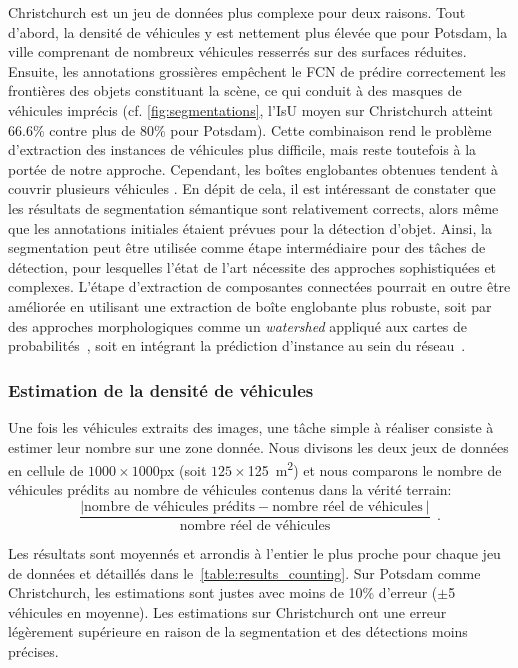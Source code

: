 Christchurch est un jeu de données plus complexe pour deux raisons. Tout d'abord, la densité de véhicules y est nettement plus élevée que pour Potsdam, la ville comprenant de nombreux véhicules resserrés sur des surfaces réduites. Ensuite, les annotations grossières empêchent le \gls{FCN} de prédire correctement les frontières des objets constituant la scène, ce qui conduit à des masques de véhicules imprécis (cf. \cref{fig:segmentations}, l'\gls{IsU} moyen sur Christchurch atteint 66.6\% contre plus de 80\% pour Potsdam). Cette combinaison rend le problème d'extraction des instances de véhicules plus difficile, mais reste toutefois à la portée de notre approche. Cependant, les boîtes englobantes obtenues tendent à couvrir plusieurs véhicules .
En dépit de cela, il est intéressant de constater que les résultats de segmentation sémantique sont relativement corrects, alors même que les annotations initiales étaient prévues pour la détection d'objet. Ainsi, la segmentation peut être utilisée comme étape intermédiaire pour des tâches de détection, pour lesquelles l'état de l'art nécessite des approches sophistiquées et complexes. L'étape d'extraction de composantes connectées pourrait en outre être améliorée en utilisant une extraction de boîte englobante plus robuste, soit par des approches morphologiques comme un \emph{watershed} appliqué aux cartes de probabilités~\cite{beucher_morphological_1993,bai_deep_2017}, soit en intégrant la prédiction d'instance au sein du réseau~\cite{dai_instance-aware_2015,he_mask_2017}.

\subsubsection{Estimation de la densité de véhicules}

Une fois les véhicules extraits des images, une tâche simple à réaliser consiste à estimer leur nombre sur une zone donnée. Nous divisons les deux jeux de données en cellule de $1000\times1000$px (soit $125\times$\SI{125}{\meter\squared}) et nous comparons le nombre de véhicules prédits au nombre de véhicules contenus dans la vérité terrain:
\begin{equation}
\frac{|\text{nombre de véhicules prédits} - \text{nombre réel de véhicules}~|}{\text{nombre réel de véhicules}}~~.
\end{equation}

Les résultats sont moyennés et arrondis à l'entier le plus proche pour chaque jeu de données et détaillés dans le~\cref{table:results_counting}. Sur Potsdam comme Christchurch, les estimations sont justes avec moins de 10\% d'erreur ($\pm$5 véhicules en moyenne). Les estimations sur Christchurch ont une erreur légèrement supérieure en raison de la segmentation et des détections moins précises.

